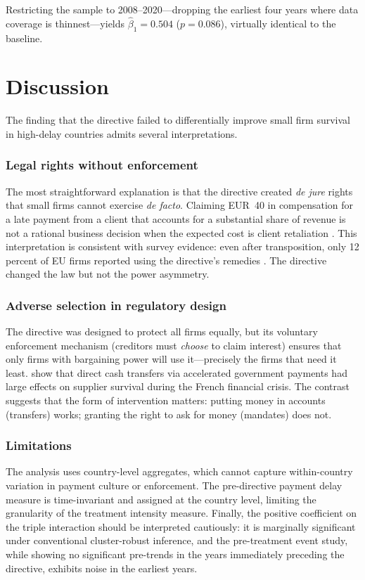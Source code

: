 \documentclass[12pt]{article}
\begin{document}
Restricting the sample to 2008--2020---dropping the earliest four years where data coverage is thinnest---yields $\hat{\beta}_1 = 0.504$ ($p = 0.086$), virtually identical to the baseline.




\section{Discussion}
\label{sec:discussion}

The finding that the directive failed to differentially improve small firm survival in high-delay countries admits several interpretations.

\subsubsection*{Legal rights without enforcement} The most straightforward explanation is that the directive created \emph{de jure} rights that small firms cannot exercise \emph{de facto}. Claiming EUR~40 in compensation for a late payment from a client that accounts for a substantial share of revenue is not a rational business decision when the expected cost is client retaliation \citep{Connell2014}. This interpretation is consistent with survey evidence: even after transposition, only 12 percent of EU firms reported using the directive's remedies \citep{EuropeanCommission2016}. The directive changed the law but not the power asymmetry.

\subsubsection*{Adverse selection in regulatory design} The directive was designed to protect all firms equally, but its voluntary enforcement mechanism (creditors must \emph{choose} to claim interest) ensures that only firms with bargaining power will use it---precisely the firms that need it least. \citet{Barrot2016} show that direct cash transfers via accelerated government payments had large effects on supplier survival during the French financial crisis. The contrast suggests that the form of intervention matters: putting money in accounts (transfers) works; granting the right to ask for money (mandates) does not.

\subsubsection*{Limitations} The analysis uses country-level aggregates, which cannot capture within-country variation in payment culture or enforcement. The pre-directive payment delay measure is time-invariant and assigned at the country level, limiting the granularity of the treatment intensity measure. Finally, the positive coefficient on the triple interaction should be interpreted cautiously: it is marginally significant under conventional cluster-robust inference, and the pre-treatment event study, while showing no significant pre-trends in the years immediately preceding the directive, exhibits noise in the earliest years.
\end{document}

